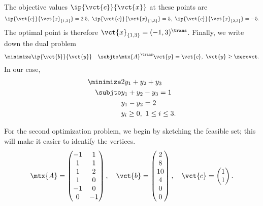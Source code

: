\documentclass{article}
\begin{document}
\begin{figure}[h!]
\centering
{}
\end{figure}
The objective values $\ip{\vct{c}}{\vct{x}}$ at these points are
\begin{equation*}
 \ip{\vct{c}}{\vct{x}_{\{1,2\}}} = 2.5, \ \ip{\vct{c}}{\vct{x}_{\{1,3\}}} = 5, \ \ip{\vct{c}}{\vct{x}_{\{2,3\}}} = -5.
\end{equation*}
The optimal point is therefore $\vct{x}_{\{1,3\}}=(-1,3)^{\trans}$. 
Finally, we write down the dual problem
\begin{equation*}
 \minimize \ip{\vct{b}}{\vct{y}} \quad \subjto \mtx{A}^{\trans}\vct{y}=\vct{c}, \ \vct{y}\geq \zerovct.
\end{equation*}
In our case,
\begin{align*}
 \minimize & 2y_1+y_2+y_3\\
 \subjto & y_1+y_2-y_3= 1\\
 & y_1-y_2=2\\
 & y_i\geq 0, \ 1\leq i\leq 3.
\end{align*}

For the second optimization problem, we begin by sketching the feasible set; this will make it easier to identify the vertices. 
\begin{equation*}
 \mtx{A} = \begin{pmatrix} -1 & 1\\1 & 1\\1 & 2\\ 1 & 0\\ -1 & 0\\ 0 & -1\end{pmatrix}, \quad
 \vct{b} = \begin{pmatrix} 2\\8\\10\\4\\0\\0 \end{pmatrix}, \quad
 \vct{c} = \begin{pmatrix} 1\\1\end{pmatrix}.
\end{equation*}
\end{document}
